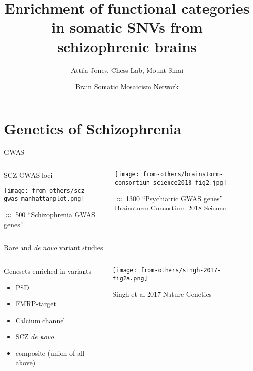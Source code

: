 \documentclass[usenames,dvipsnames]{beamer}
\title{Enrichment of functional categories in somatic SNVs from schizophrenic
brains}
\author{Attila Jones, Chess Lab, Mount Sinai}
\date{Brain Somatic Mosaicism Network}
\begin{document}
\maketitle

\section{Genetics of Schizophrenia}

\begin{frame}{GWAS}

\begin{columns}[t]
\begin{column}{0.5\textwidth}
\begin{center}
SCZ GWAS loci

\texttt{[image: from-others/scz-gwas-manhattanplot.png]}

\footnotesize
\(\approx\) 500 ``Schizophrenia GWAS genes''
\end{center}
\end{column}

\begin{column}{0.5\textwidth}

\texttt{[image: from-others/brainstorm-consortium-science2018-fig2.jpg]}

\footnotesize
\(\approx\) 1300 ``Psychiatric GWAS genes''
{\tiny Brainstorm Consortium 2018 Science}
\end{column}
\end{columns}
\end{frame}

\begin{frame}{Rare and \textit{de novo} variant studies}
\begin{columns}[t]
\begin{column}{0.5\textwidth}
Genesets enriched in variants
\begin{itemize}
\item PSD
\item FMRP-target
\item Calcium channel
\item SCZ \textit{de novo}
\item composite (union of all above)
\end{itemize}
\end{column}

\begin{column}{0.5\textwidth}

\texttt{[image: from-others/singh-2017-fig2a.png]}

\tiny Singh et al 2017 Nature Genetics
\end{column}
\end{columns}
\end{frame}
\end{document}
